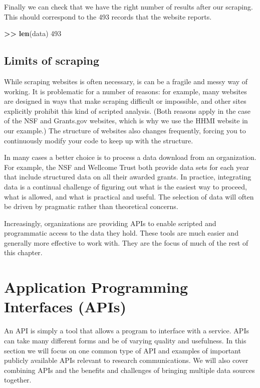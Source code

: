 \documentclass[]{krantz}
\newenvironment{Shaded}{\begin{snugshade}}{\end{snugshade}}
\newcommand{\KeywordTok}[1]{\textcolor[rgb]{0.13,0.29,0.53}{\textbf{#1}}}
\newcommand{\DecValTok}[1]{\textcolor[rgb]{0.00,0.00,0.81}{#1}}
\newcommand{\StringTok}[1]{\textcolor[rgb]{0.31,0.60,0.02}{#1}}
\newcommand{\OperatorTok}[1]{\textcolor[rgb]{0.81,0.36,0.00}{\textbf{#1}}}
\newcommand{\ErrorTok}[1]{\textcolor[rgb]{0.64,0.00,0.00}{\textbf{#1}}}
\newcommand{\NormalTok}[1]{#1}
\begin{document}
Finally we can check that we have the right number of results after our
scraping. This should correspond to the 493 records that the website
reports.

\begin{Shaded}
\begin{Highlighting}[]
\OperatorTok{>}\ErrorTok{>}\StringTok{ }\KeywordTok{len}\NormalTok{(data)}
\DecValTok{493}
\end{Highlighting}
\end{Shaded}

\subsection{Limits of scraping}\label{limits-of-scraping}

While scraping websites is often necessary, is can be a fragile and
messy way of working. It is problematic for a number of reasons: for
example, many websites are designed in ways that make scraping difficult
or impossible, and other sites explicitly prohibit this kind of scripted
analysis. (Both reasons apply in the case of the NSF and Grants.gov
websites, which is why we use the HHMI website in our example.) The
structure of websites also changes frequently, forcing you to
continuously modify your code to keep up with the structure.

In many cases a better choice is to process a data download from an
organization. For example, the NSF and Wellcome Trust both provide data
sets for each year that include structured data on all their awarded
grants. In practice, integrating data is a continual challenge of
figuring out what is the easiest way to proceed, what is allowed, and
what is practical and useful. The selection of data will often be driven
by pragmatic rather than theoretical concerns.

Increasingly, organizations are providing APIs to enable scripted and
programmatic access to the data they hold. These tools are much easier
and generally more effective to work with. They are the focus of much of
the rest of this chapter.

\section{Application Programming Interfaces
(APIs)}\label{application-programming-interfaces-apis}

An API is simply a tool that allows a program to interface with a
service. APIs can take many different forms and be of varying quality
and usefulness. In this section we will focus on one common type of API
and examples of important publicly available APIs relevant to research
communications. We will also cover combining APIs and the benefits and
challenges of bringing multiple data sources together.
\end{document}
